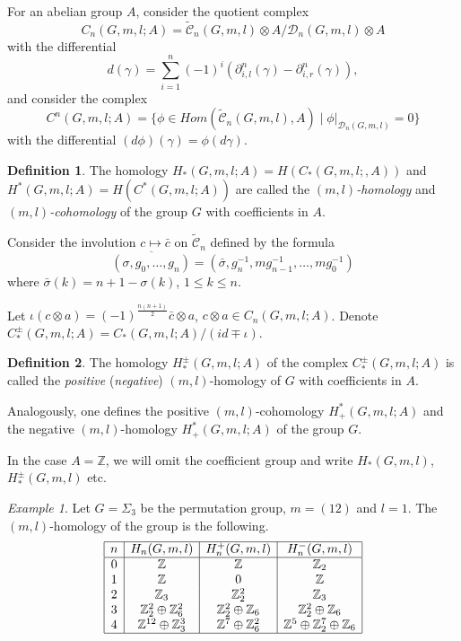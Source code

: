 \documentclass{article}
\theoremstyle{definition}
\newtheorem{definition}{Definition}
\theoremstyle{remark}
\newtheorem{example}{Example}
\def\Z{{\mathbb Z}}
\begin{document}
For an abelian group $A$, consider the quotient complex
\[
    C_n(G,m,l;A)=\widetilde{\mathcal C}_n(G,m,l)\otimes A/{\mathcal D}_n(G,m,l)\otimes A
\]
with the differential
\[
d(\gamma)=\sum_{i=1}^n(-1)^i(\partial^n_{i,l}(\gamma)-\partial^n_{i,r}(\gamma)),
\]
and consider the complex
\[
    C^n(G,m,l;A)=\{\phi\in Hom(\widetilde{\mathcal C}_n(G,m,l),A)\mid \phi|_{{\mathcal D}_n(G,m,l)}=0\}
\]
with the differential $(d\phi)(\gamma)=\phi(d\gamma)$.

\begin{definition}\label{def:homotopy_crossing_homology}
    The homology $H_*(G,m,l;A)=H(C_*(G,m,l;,A))$ and $H^*(G,m,l;A)=H(C^*(G,m,l;A))$ are called the \emph{$(m,l)$-homology} and \emph{$(m,l)$-cohomology} of the group $G$ with coefficients in $A$.
\end{definition}

Consider the involution $c\mapsto \bar c$ on  $\tilde{\mathcal C}_{n}$ defined by the formula
\[
 \overline{(\sigma,g_0,\dots,g_n)}=(\bar\sigma,g_n^{-1},mg_{n-1}^{-1},\dots,mg_0^{-1})
\]
where $\bar\sigma(k)=n+1-\sigma(k)$, $1\le k\le n$.

Let $\iota(c\otimes a)=(-1)^{\frac{n(n+1)}2}\bar c\otimes a$, $c\otimes a\in C_n(G,m,l;A)$. Denote $C^\pm_*(G,m,l;A)=C_*(G,m,l;A)/(id\mp\iota)$.

\begin{definition}
    The homology $H^\pm_*(G,m,l;A)$ of the complex $C^\pm_*(G,m,l;A)$ is called the \emph{positive} (\emph{negative}) $(m,l)$-homology of $G$ with coefficients in $A$.

Analogously, one defines the positive $(m,l)$-cohomology $H_+^*(G,m,l;A)$ and the negative $(m,l)$-homology $H_+^*(G,m,l;A)$ of the group $G$.
\end{definition}

In the case $A=\Z$, we will omit the coefficient group and write $H_*(G,m,l)$, $H^\pm_*(G,m,l)$ etc.

\begin{example}\label{exa:S3_ml_homology}
Let $G=\Sigma_3$ be the permutation group, $m=(12)$ and $l=1$. The $(m,l)$-homology of the group is the following.
\[
\begin{array}{|c|c|c|c|}
\hline
    n & H_n(G,m,l) & H^+_n(G,m,l) & H^-_n(G,m,l)\\
    \hline
    0 & \Z & \Z & \Z_2 \\
    1 & \Z & 0 & \Z \\
    2 & \Z_3 & \Z_2^2 & \Z_3 \\
    3 & \Z_2^2\oplus\Z_6^2 & \Z_2^2\oplus\Z_6 & \Z_2^2\oplus\Z_6 \\
    4 & \Z^{12}\oplus\Z_3^3 & \Z^{7}\oplus\Z_6^2 &  \Z^{5}\oplus\Z_2^7 \oplus\Z_6 \\
    \hline
\end{array}
\]
\end{example}
\end{document}
